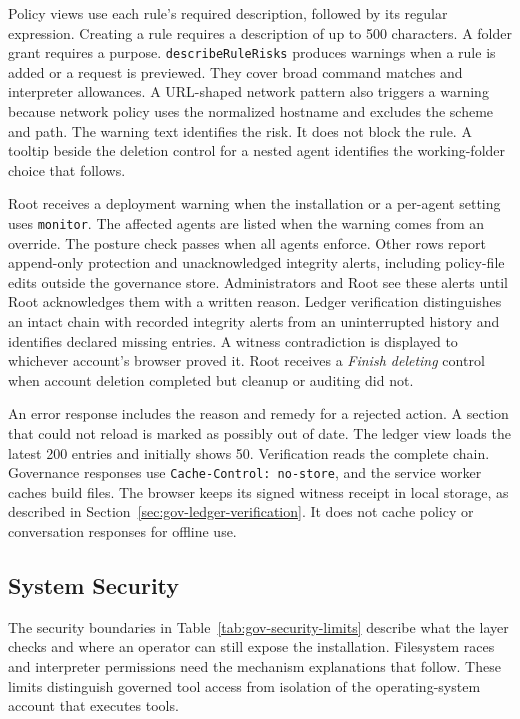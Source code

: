 {\color{red}Policy views use each rule's required description, followed by its
regular expression. Creating a rule requires a description of up to 500
characters. A folder grant requires a purpose. \texttt{describeRuleRisks}
produces warnings when a rule is added or a request is previewed. They cover
broad command matches and interpreter allowances. A URL-shaped network
pattern also triggers a warning because network policy uses the normalized
hostname and excludes the scheme and path. The warning text identifies the
risk. It does not block the rule. A tooltip beside the deletion control for
a nested agent identifies the working-folder choice that follows.

Root receives a deployment warning when the installation or a per-agent
setting uses \texttt{monitor}. The affected agents are listed when the warning
comes from an override. The posture check passes when all agents enforce. Other rows
report append-only protection and unacknowledged integrity alerts, including
policy-file edits outside the governance store. Administrators and Root see
these alerts until Root acknowledges them with a written reason. Ledger
verification distinguishes an intact chain with recorded integrity alerts
from an uninterrupted history and identifies declared missing entries.
A witness contradiction is displayed to whichever account's browser proved
it. Root receives a \textit{Finish deleting} control when account deletion
completed but cleanup or auditing did not.

An error response includes the reason and remedy for a rejected action. A section that could not reload
is marked as possibly out of date. The ledger view loads the latest 200
entries and initially shows 50. Verification reads the complete chain.
Governance responses use \texttt{Cache-Control: no-store}, and the service
worker caches build files. The browser keeps its signed witness receipt in
local storage, as described in Section~\ref{sec:gov-ledger-verification}.
It does not cache policy or conversation responses for offline use.}

\subsection{System Security}
\label{sec:gov-security}

{\color{red}The security boundaries in Table~\ref{tab:gov-security-limits}
describe what the layer checks and where an operator can still expose the
installation. Filesystem races and interpreter permissions need the mechanism
explanations that follow. These limits distinguish governed tool access from
isolation of the operating-system account that executes tools.}

